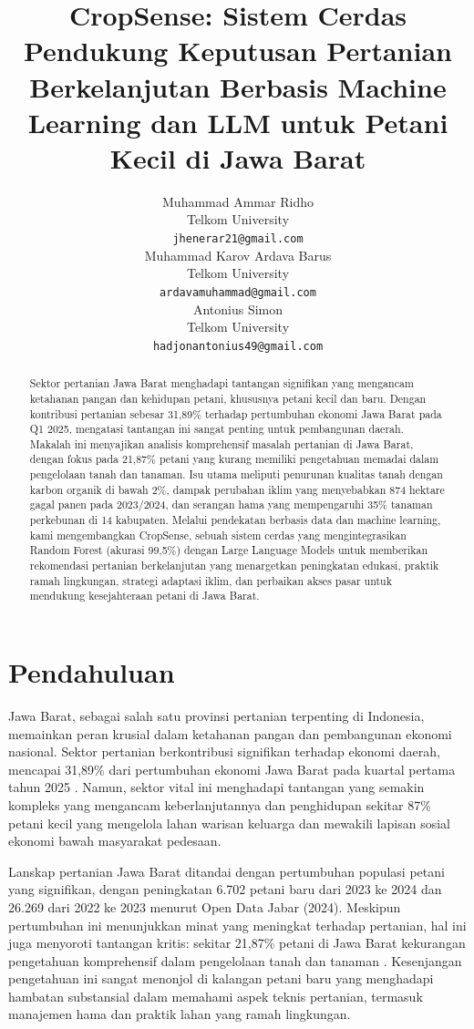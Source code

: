 \documentclass{article} %
\title{CropSense: Sistem Cerdas Pendukung Keputusan Pertanian Berkelanjutan Berbasis Machine Learning dan LLM untuk Petani Kecil di Jawa Barat}
\author{
Muhammad Ammar Ridho \\
Telkom University \\
\texttt{jhenerar21@gmail.com} \\
\And
Muhammad Karov Ardava Barus \\
Telkom University \\
\texttt{ardavamuhammad@gmail.com} \\
\And
Antonius Simon \\
Telkom University \\
\texttt{hadjonantonius49@gmail.com} \\
}
\begin{document}
\maketitle

\begin{abstract}
Sektor pertanian Jawa Barat menghadapi tantangan signifikan yang mengancam ketahanan pangan dan kehidupan petani, khususnya petani kecil dan baru. Dengan kontribusi pertanian sebesar 31,89\% terhadap pertumbuhan ekonomi Jawa Barat pada Q1 2025, mengatasi tantangan ini sangat penting untuk pembangunan daerah. Makalah ini menyajikan analisis komprehensif masalah pertanian di Jawa Barat, dengan fokus pada 21,87\% petani yang kurang memiliki pengetahuan memadai dalam pengelolaan tanah dan tanaman. Isu utama meliputi penurunan kualitas tanah dengan karbon organik di bawah 2\%, dampak perubahan iklim yang menyebabkan 874 hektare gagal panen pada 2023/2024, dan serangan hama yang mempengaruhi 35\% tanaman perkebunan di 14 kabupaten. Melalui pendekatan berbasis data dan machine learning, kami mengembangkan CropSense, sebuah sistem cerdas yang mengintegrasikan Random Forest (akurasi 99,5\%) dengan Large Language Models untuk memberikan rekomendasi pertanian berkelanjutan yang menargetkan peningkatan edukasi, praktik ramah lingkungan, strategi adaptasi iklim, dan perbaikan akses pasar untuk mendukung kesejahteraan petani di Jawa Barat.
\end{abstract}

\section{Pendahuluan}


Jawa Barat, sebagai salah satu provinsi pertanian terpenting di Indonesia, memainkan peran krusial dalam ketahanan pangan dan pembangunan ekonomi nasional. Sektor pertanian berkontribusi signifikan terhadap ekonomi daerah, mencapai 31,89\% dari pertumbuhan ekonomi Jawa Barat pada kuartal pertama tahun 2025 \cite{b1}. Namun, sektor vital ini menghadapi tantangan yang semakin kompleks yang mengancam keberlanjutannya dan penghidupan sekitar 87\% petani kecil yang mengelola lahan warisan keluarga dan mewakili lapisan sosial ekonomi bawah masyarakat pedesaan.

Lanskap pertanian Jawa Barat ditandai dengan pertumbuhan populasi petani yang signifikan, dengan peningkatan 6.702 petani baru dari 2023 ke 2024 dan 26.269 dari 2022 ke 2023 menurut Open Data Jabar (2024). Meskipun pertumbuhan ini menunjukkan minat yang meningkat terhadap pertanian, hal ini juga menyoroti tantangan kritis: sekitar 21,87\% petani di Jawa Barat kekurangan pengetahuan komprehensif dalam pengelolaan tanah dan tanaman \cite{b2}. Kesenjangan pengetahuan ini sangat menonjol di kalangan petani baru yang menghadapi hambatan substansial dalam memahami aspek teknis pertanian, termasuk manajemen hama dan praktik lahan yang ramah lingkungan.
\end{document}
